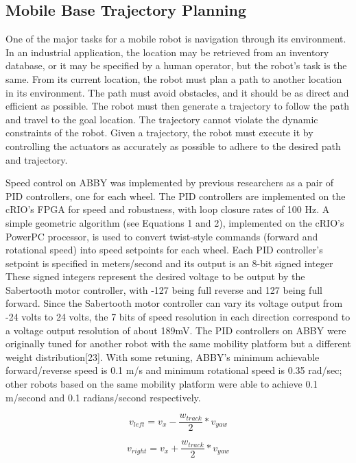 \documentclass[]{cwru} %
\begin{document}
\subsection{Mobile Base Trajectory Planning}

One of the major tasks for a mobile robot is navigation through its
environment. In an industrial application, the location may be retrieved
from an inventory database, or it may be specified by a human operator,
but the robot's task is the same. From its current location, the robot
must plan a path to another location in its environment. The path must
avoid obstacles, and it should be as direct and efficient as possible.
The robot must then generate a trajectory to follow the path and travel
to the goal location. The trajectory cannot violate the dynamic
constraints of the robot. Given a trajectory, the robot must execute it
by controlling the actuators as accurately as possible to adhere to the
desired path and trajectory.

Speed control on ABBY was implemented by previous researchers as a pair
of PID controllers, one for each wheel. The PID controllers are
implemented on the cRIO's FPGA for speed and robustness, with loop
closure rates of 100 Hz. A simple geometric algorithm (see Equations 1
and 2), implemented on the cRIO's PowerPC processor, is used to convert
twist-style commands (forward and rotational speed) into speed setpoints
for each wheel. Each PID controller's setpoint is specified in
meters/second and its output is an 8-bit signed integer These signed
integers represent the desired voltage to be output by the Sabertooth
motor controller, with -127 being full reverse and 127 being full
forward. Since the Sabertooth motor controller can vary its voltage
output from -24 volts to 24 volts, the 7 bits of speed resolution in
each direction correspond to a voltage output resolution of about 189mV.
The PID controllers on ABBY were originally tuned for another robot with
the same mobility platform but a different weight distribution{[}23{]}.
With some retuning, ABBY's minimum achievable forward/reverse speed is
0.1 m/s and minimum rotational speed is 0.35 rad/sec; other robots based
on the same mobility platform were able to achieve 0.1 m/second and 0.1
radians/second respectively.

\begin{equation}
\label{eq1}
 v_{left} = v_x - \frac{w_{track}}{2} * v_{yaw}
\end{equation}

\begin{equation}
\label{eq2}
v_{right} = v_x + \frac{w_{track}}{2} * v_{yaw}
\end{equation}
\end{document}
